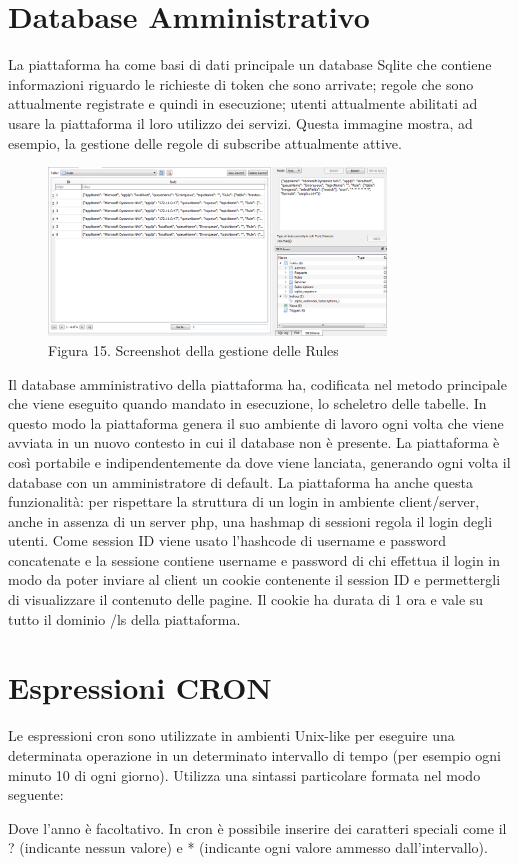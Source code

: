 \section{Database Amministrativo}
La piattaforma ha come basi di dati principale un database Sqlite che contiene informazioni riguardo le richieste di token che sono arrivate; regole che sono attualmente registrate e quindi in esecuzione; utenti attualmente abilitati ad usare la piattaforma il loro utilizzo dei servizi. \newline
Questa immagine mostra, ad esempio, la gestione delle regole di subscribe attualmente attive.
\begin{figure}[h]
	\centering
	\includegraphics[width=0.8\textwidth]{db-rules.png}
	\caption*{Figura 15. Screenshot della gestione delle Rules}
\end{figure}
\clearpage
Il database amministrativo della piattaforma ha, codificata nel metodo principale che viene eseguito quando mandato in esecuzione, lo scheletro delle tabelle. In questo modo la piattaforma genera il suo ambiente di lavoro ogni volta che viene avviata in un nuovo contesto in cui il database non è presente. La piattaforma è così portabile e indipendentemente da dove viene lanciata, generando ogni volta il database con un amministratore di default. \newline
La piattaforma ha anche questa funzionalità: per rispettare la struttura di un login in ambiente client/server, anche in assenza di un server php, una hashmap di sessioni regola il login degli utenti. Come session ID viene usato l’hashcode di username e password concatenate e la sessione contiene username e password di chi effettua il login in modo da poter inviare al client un cookie contenente il session ID e permettergli di visualizzare il contenuto delle pagine. Il cookie ha durata di 1 ora e vale su tutto il dominio /ls della piattaforma.

\section{Espressioni CRON}
Le espressioni cron sono utilizzate in ambienti Unix-like per eseguire una determinata operazione in un determinato intervallo di tempo (per esempio ogni minuto 10 di ogni giorno). Utilizza una sintassi particolare formata nel modo seguente:
\begin{center}
	{\selectfont
		
	}
\end{center}
Dove l’anno è facoltativo. In cron è possibile inserire dei caratteri speciali come il ? (indicante nessun valore) e * (indicante ogni valore ammesso dall’intervallo).

